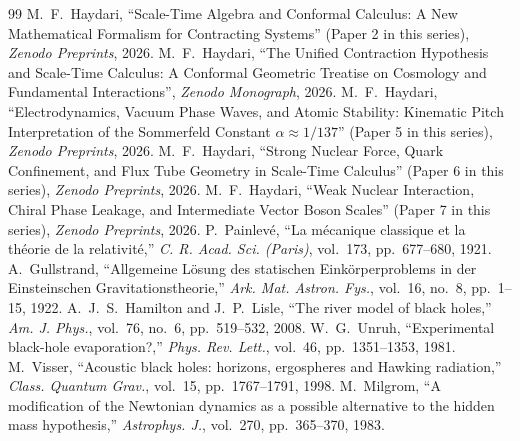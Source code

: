 \documentclass[11pt,a4paper]{article}
\begin{document}
\begin{thebibliography}{99}
     M.~F.~Haydari, ``Scale-Time Algebra and Conformal Calculus: A New Mathematical Formalism for Contracting Systems'' (Paper 2 in this series), \textit{Zenodo Preprints}, 2026.
     M.~F.~Haydari, ``The Unified Contraction Hypothesis and Scale-Time Calculus: A Conformal Geometric Treatise on Cosmology and Fundamental Interactions'', \textit{Zenodo Monograph}, 2026.
     M.~F.~Haydari, ``Electrodynamics, Vacuum Phase Waves, and Atomic Stability: Kinematic Pitch Interpretation of the Sommerfeld Constant $\alpha \approx 1/137$'' (Paper 5 in this series), \textit{Zenodo Preprints}, 2026.
     M.~F.~Haydari, ``Strong Nuclear Force, Quark Confinement, and Flux Tube Geometry in Scale-Time Calculus'' (Paper 6 in this series), \textit{Zenodo Preprints}, 2026.
     M.~F.~Haydari, ``Weak Nuclear Interaction, Chiral Phase Leakage, and Intermediate Vector Boson Scales'' (Paper 7 in this series), \textit{Zenodo Preprints}, 2026.
     P.~Painlev\'e, ``La m\'ecanique classique et la th\'eorie de la relativit\'e,'' \textit{C. R. Acad. Sci. (Paris)}, vol.~173, pp.~677--680, 1921.
     A.~Gullstrand, ``Allgemeine L\"osung des statischen Eink\"orperproblems in der Einsteinschen Gravitationstheorie,'' \textit{Ark. Mat. Astron. Fys.}, vol.~16, no.~8, pp.~1--15, 1922.
     A.~J.~S.~Hamilton and J.~P.~Lisle, ``The river model of black holes,'' \textit{Am. J. Phys.}, vol.~76, no.~6, pp.~519--532, 2008.
     W.~G.~Unruh, ``Experimental black-hole evaporation?,'' \textit{Phys. Rev. Lett.}, vol.~46, pp.~1351--1353, 1981.
     M.~Visser, ``Acoustic black holes: horizons, ergospheres and Hawking radiation,'' \textit{Class. Quantum Grav.}, vol.~15, pp.~1767--1791, 1998.
     M.~Milgrom, ``A modification of the Newtonian dynamics as a possible alternative to the hidden mass hypothesis,'' \textit{Astrophys. J.}, vol.~270, pp.~365--370, 1983.
\end{thebibliography}
\end{document}
